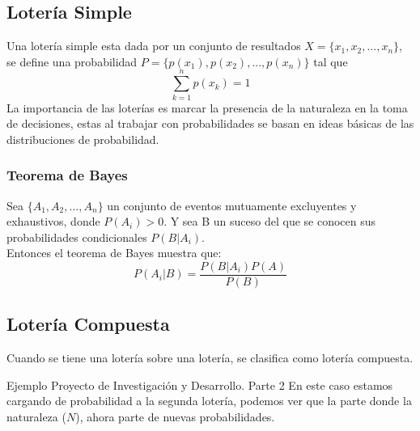 \documentclass[12pt]{article}
\begin{document}
\subsection{Lotería Simple}
Una lotería simple esta dada por un conjunto de resultados $X=\{x_1,x_2,...,x_n\}$, se define una probabilidad  $P=\{p(x_1),p(x_2),...,p(x_n)\}$ tal que $$\sum_{k=1}^np(x_k)=1$$
La importancia de las loterías es marcar la presencia de la naturaleza en la toma de decisiones, estas al trabajar con probabilidades se basan en ideas básicas de las distribuciones de probabilidad. 
\subsubsection{Teorema de Bayes}
Sea $\{A_1,A_2,...,A_n\}$ un conjunto de eventos mutuamente excluyentes y exhaustivos, donde $P(A_i)>0$. Y sea B un suceso del que se conocen sus probabilidades condicionales $P(B|A_i)$. \\
Entonces el teorema de Bayes muestra que: 
$$P(A_i|B)=\frac{P(B|A_i)P(A)}{P(B)}$$
\subsection{Lotería Compuesta}
Cuando se tiene una lotería sobre una lotería, se clasifica como lotería compuesta. 
\begin{ejemplo}{Ejemplo Proyecto de Investigación y Desarrollo. Parte 2}
    En este caso estamos cargando de probabilidad a la segunda lotería, podemos ver que la parte donde la naturaleza ($N$), ahora parte de nuevas probabilidades. 
    \begin{figure} [H]
        \centering
        
        \label{fig:placeholder}
    \end{figure}
\end{ejemplo}
\end{document}
